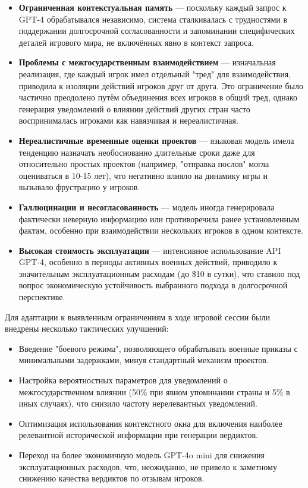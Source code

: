 \begin{itemize}
    \item \textbf{Ограниченная контекстуальная память} — поскольку каждый запрос к GPT-4 обрабатывался независимо, система сталкивалась с трудностями в поддержании долгосрочной согласованности и запоминании специфических деталей игрового мира, не включённых явно в контекст запроса.

    \item \textbf{Проблемы с межгосударственным взаимодействием} — изначальная реализация, где каждый игрок имел отдельный "{}тред"{} для взаимодействия, приводила к изоляции действий игроков друг от друга. Это ограничение было частично преодолено путём объединения всех игроков в общий тред, однако генерация уведомлений о влиянии действий других стран часто воспринималась игроками как навязчивая и нереалистичная.

    \item \textbf{Нереалистичные временные оценки проектов} — языковая модель имела тенденцию назначать необоснованно длительные сроки даже для относительно простых проектов (например, "{}отправка послов"{} могла оцениваться в 10-15 лет), что негативно влияло на динамику игры и вызывало фрустрацию у игроков.

    \item \textbf{Галлюцинации и несогласованность} — модель иногда генерировала фактически неверную информацию или противоречила ранее установленным фактам, особенно при взаимодействии нескольких игроков в одном контексте.

    \item \textbf{Высокая стоимость эксплуатации} — интенсивное использование API GPT-4, особенно в периоды активных военных действий, приводило к значительным эксплуатационным расходам (до \$10 в сутки), что ставило под вопрос экономическую устойчивость выбранного подхода в долгосрочной перспективе.
\end{itemize}

Для адаптации к выявленным ограничениям в ходе игровой сессии были внедрены несколько тактических улучшений:

\begin{itemize}
    \item Введение "{}боевого режима"{}, позволяющего обрабатывать военные приказы с минимальными задержками, минуя стандартный механизм проектов.

    \item Настройка вероятностных параметров для уведомлений о межгосударственном влиянии (50\% при явном упоминании страны и 5\% в иных случаях), что снизило частоту нерелевантных уведомлений.

    \item Оптимизация использования контекстного окна для включения наиболее релевантной исторической информации при генерации вердиктов.

    \item Переход на более экономичную модель GPT-4o mini для снижения эксплуатационных расходов, что, неожиданно, не привело к заметному снижению качества вердиктов по отзывам игроков.
\end{itemize}

